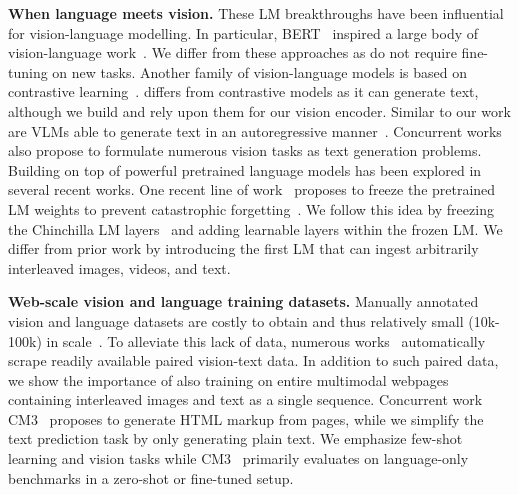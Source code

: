 \textbf{When language meets vision.}
These LM breakthroughs have been influential for vision-language modelling.
In particular, BERT~\citep{bert} inspired a large body of vision-language work~\citep{lu2019vilbert,su2019vl,chen2020uniter,hendricks2021decoupling,wang2021vlmo,li2020oscar,tan2019lxmert,zhu2020actbert,wang2021ufo,li2020hero,gan2020large,fu2021violet,zellers2021merlot,zellers2022merlot,singh2021flava,sun2019videobert}.
We differ from these approaches as \methodfamily{} do not require fine-tuning on new tasks.
Another family of vision-language models is based on contrastive learning~\citep{alayrac2020self,clip,align,zhai2021lit,pham2021combined,miech2020end,bain2021frozen,yuan2021florence,li2021align,yao2021filip,jain2021mural}.
\method{} differs from contrastive models as it can generate text,
although we build and rely upon them for our vision encoder.
Similar to our work are VLMs able to generate text in an autoregressive manner~\citep{vinyals2015show,donahue2015long,luo2020univl,hu2021scaling,dai2022}.
Concurrent works~\citep{wang2021simvlm,cho2021unifying,wang2022unifying,zhu2021uni,li2022blip} also propose to formulate numerous vision tasks as text generation problems.
Building on top of powerful pretrained language models has been explored in several recent works.
One recent line of work~\citep{tsimpoukelli2021multimodal,eichenberg2021magma,mokady2021clipcap,luo2022vc,yang2021empirical,zeng2022socraticmodels} proposes to freeze the pretrained LM weights to prevent catastrophic forgetting~\citep{mccloskey1989catastrophic}.
We follow this idea by freezing the Chinchilla LM layers~\citep{chinchilla} and adding learnable layers within the frozen LM.
We differ from prior work by introducing the first LM that can ingest arbitrarily interleaved images, videos, and text.

\textbf{Web-scale vision and language training datasets.}
Manually annotated vision and language datasets are costly to obtain and thus relatively small (10k-100k) in scale~\citep{young2014image,chen2015microsoft,antol2015vqa,marino2019ok,wang2019vatex,xiao2021next}.
To alleviate this lack of data, numerous works~\citep{align,sharma2018conceptual,changpinyo2021conceptual,thomee2016yfcc100m} automatically scrape readily available paired vision-text data.
In addition to such paired data, we show the importance of also training on entire multimodal webpages containing interleaved images and text as a single sequence.
Concurrent work CM3~\citep{aghajanyan2022cm3} proposes to generate HTML markup from pages, while we simplify the text prediction task by only generating plain text.
We emphasize few-shot learning and vision tasks while CM3~\citep{aghajanyan2022cm3} primarily evaluates on language-only benchmarks in a zero-shot or fine-tuned setup.


